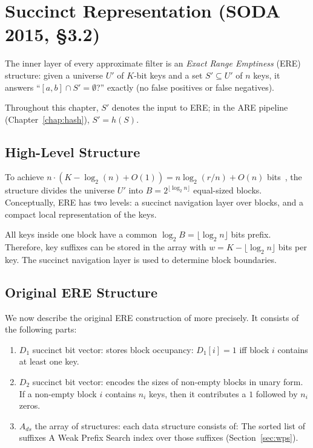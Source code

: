 \section{Succinct Representation (SODA 2015, §3.2)}
\label{sec:ere}

The inner layer of every approximate filter is an \emph{Exact Range Emptiness} (ERE)
structure: given a universe $U'$ of $K$-bit keys
and a set $S' \subseteq U'$ of $n$ keys, it answers
``$[a, b] \cap S' = \emptyset$?'' exactly (no false positives or false negatives).

\begin{remark}
    Throughout this chapter, $S'$ denotes the input to ERE; in the ARE pipeline (Chapter~\ref{chap:hash}), $S' = h(S)$.
\end{remark}

\subsection{High-Level Structure}
\label{subsec:ere-high-level-structure}

To achieve $n \cdot (K - \log_2(n) + O(1)) = n \log_2(r/n) + O(n)$ bits~\citep{goswami2015approximate},
the structure divides the universe $U'$ into $B = 2^{\lfloor \log_2 n \rfloor}$ equal-sized blocks.
Conceptually, ERE has two levels: a succinct navigation layer over blocks, and a compact local representation of the keys.

All keys inside one block have a common $\log_2 B = \lfloor \log_2 n \rfloor$ bits prefix.
Therefore, key suffixes can be stored in the array with $w = K - \lfloor \log_2 n \rfloor$ bits per key.
The succinct navigation layer is used to determine block boundaries.

\subsection{Original ERE Structure}
\label{subsec:ere-original-structure}

We now describe the original ERE construction of \citet{goswami2015approximate}
more precisely.
It consists of the following parts:

\begin{enumerate}
    \item $D_1$ succinct bit vector: stores block occupancy: $D_1[i] = 1$ iff block $i$ contains at least one key.
    \item $D_2$ succinct bit vector: encodes the sizes of non-empty blocks in unary form.
    If a non-empty block $i$ contains $n_i$ keys, then it contributes a $1$ followed by $n_i$ zeros.
    \item $A_{ds}$ the array of structures: each data structure consists of:
    \subitem The sorted list of suffixes
    \subitem A Weak Prefix Search index over those suffixes
    (Section~\ref{sec:wps}).
\end{enumerate}

